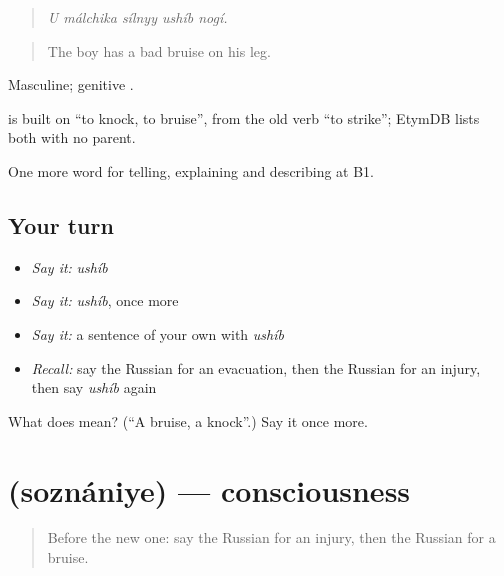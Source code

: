 \begin{quote}
\emph{U málchika sílnyy ushíb nogí.}
\end{quote}

\begin{quote}
The boy has a bad bruise on his leg.
\end{quote}

Masculine; genitive \emph{}.

\begin{cousinweb}
\emph{} is built on \emph{} \textquotedblleft{}to knock, to bruise\textquotedblright{}, from the old verb \emph{} \textquotedblleft{}to strike\textquotedblright{}; EtymDB lists both with no parent.
\end{cousinweb}

\begin{grammarlens}[title={What you've built}]
One more word for telling, explaining and describing at B1.
\end{grammarlens}

\subsection*{Your turn}
\begin{itemize}
\raggedright
  \item \emph{Say it:} \emph{ushíb}
  \item \emph{Say it:} \emph{ushíb}, once more
  \item \emph{Say it:} a sentence of your own with \emph{ushíb}
  \item \emph{Recall:} say the Russian for an evacuation, then the Russian for an injury, then say \emph{ushíb} again
\end{itemize}

\begin{tcolorbox}[breakable,colback=teal!4,colframe=teal!35!black,title={Before you move on}]
What does  mean? (\textquotedblleft{}A bruise, a knock\textquotedblright{}.) Say it once more.
\end{tcolorbox}
\section[\texorpdfstring{\ru{сознание} (soznániye)}{сознание (soznániye)}]{ (soznániye) — consciousness}

\label{lesson:RU-C297-soznaniye}



\begin{quote}
Before the new one: say the Russian for an injury, then the Russian for a bruise.
\end{quote}

